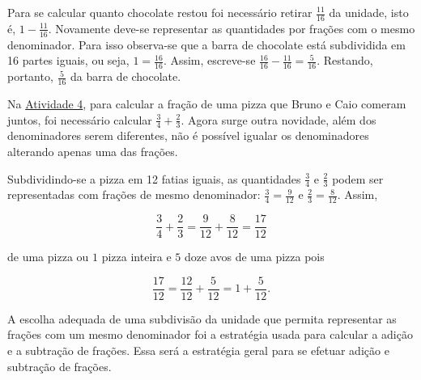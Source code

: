 Para se calcular quanto chocolate restou foi necessário retirar $\frac{11}{16}$ da unidade, isto é, $1 - \frac{11}{16}$. 
Novamente deve-se representar as quantidades por frações com o mesmo denominador. 
Para isso observa-se que a barra de chocolate está subdividida em 16 partes iguais, ou seja,  $1 = \frac{16}{16}$. Assim, escreve-se $\frac{16}{16} - \frac{11}{16} = \frac{5}{16}$. 
Restando, portanto, $\frac{5}{16}$ da barra de chocolate.

Na \hyperref[chap5-ativ4]{Atividade 4}, para calcular a fração de uma pizza que Bruno e Caio comeram juntos, foi necessário calcular $\frac{3}{4} + \frac{2}{3}$. 
Agora surge outra novidade, além dos denominadores serem diferentes, não é possível igualar os denominadores alterando apenas uma das frações.

\begin{center}
\quad\quad\quad\quad
{}
\end{center}

Subdividindo-se  a pizza em 12 fatias iguais, as quantidades $\frac{3}{4}$ e $\frac{2}{3}$ podem ser representadas com frações de mesmo denominador: $\frac{3}{4} = \frac{9}{12}$ e $\frac{2}{3} = \frac{8}{12}$. Assim,

\[ \frac{3}{4} + \frac{2}{3} = \frac{9}{12} + \frac{8}{12} = \frac{17}{12}\]

de uma pizza ou $1$ pizza inteira e $5$ doze avos de uma pizza pois 

\[\frac{17}{12} = \frac{12}{12} + \frac{5}{12} = 1 + \frac{5}{12}.\]

A escolha adequada de uma subdivisão da unidade que permita representar as frações com um mesmo denominador foi a estratégia usada para calcular a adição e a subtração de frações. 
Essa será a estratégia geral para se efetuar adição e subtração de frações.

